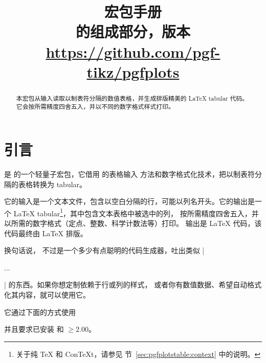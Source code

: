\documentclass[a4paper,doc2]{ltxdoc}
\title{%
    \PGFPlotstable{} 宏包手册\\
    {\small\PGFPlots{} 的组成部分，版本 \pgfplotsversion}\\
    {\small\url{https://github.com/pgf-tikz/pgfplots}}}
\begin{document}
\maketitle
\begin{abstract}
    本宏包从输入读取以制表符分隔的数值表格，并生成排版精美的
    \LaTeX{} tabular 代码。它会按所需精度四舍五入，并以不同的数字格式样式打印。
\end{abstract}

\tableofcontents


\section{引言}

\PGFPlotstable{} 是 \PGFPlots{} 的一个轻量子宏包，它借用 \PGFPlots{} 的表格输入
方法和数字格式化技术，把以制表符分隔的表格转换为 tabular。

它的输入是一个文本文件，包含以空白分隔的行，可能以列名开头。它的输出是一个
\LaTeX{} tabular\footnote{关于纯 \TeX{} 和 Con\TeX{}t，请参见
节~\ref{sec:pgfplotstable:context} 中的说明。}，其中包含文本表格中被选中的列，
按所需精度四舍五入，并以所需的数字格式（定点、整数、科学计数法等）打印。
输出是 \LaTeX{} 代码，该代码最终由 \LaTeX{} 排版。

换句话说，\PGFPlotstable{} 不过是一个多少有点聪明的代码生成器，吐出类似
|\begin{tabular}...\end{tabular}| 的东西。如果你想定制依赖于行或列的样式，
或者你有数值数据、希望自动格式化其内容，就可以使用它。

它通过下面的方式使用
%
\begin{codeexample}
\usepackage{pgfplotstable}
\end{codeexample}
%
\noindent 并且要求已安装 \PGFPlots{} 和 \PGF{} $ \ge 2.00$。
\end{document}
